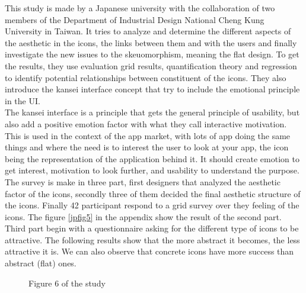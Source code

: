 \documentclass[a4paper,11pt] {article}
\theoremstyle{definition}
\begin{document}
    This study \cite{jpAnalitics} is made by a Japanese university with the collaboration of two members of the Department of Industrial Design National Cheng Kung University in Taiwan. It tries to analyze and determine the different aspects of the aesthetic in the icons, the links between them and with the users and finally investigate the new issues to the skeuomorphism, meaning the flat design. To get the results, they use evaluation grid results, quantification theory and regression to identify potential relationships between constituent of the icons. They also introduce the kansei interface concept that try to include the emotional principle in the UI.\\

    The kansei interface is a principle that gets the general principle of usability, but also add a positive emotion factor with what they call interactive motivation. This is used in the context of the app market, with lots of app doing the same things and where the need is to interest the user to look at your app, the icon being the representation of the application behind it. It should create emotion to get interest, motivation to look further, and usability to understand the purpose.\\

    The survey is make in three part, first designers that analyzed the aesthetic factor of the icons, secondly three of them decided the final aesthetic structure of the icons. Finally 42 participant respond to a grid survey over they feeling of the icons. The figure \ref{jpfig5} in the appendix show the result of the second part.\\

    Third part begin with a questionnaire asking for the different type of icons to be attractive. The following results show that the more abstract it becomes, the less attractive it is. We can also observe that concrete icons have more success than abstract (flat) ones.

    \begin{figure}[H]
      \caption{Figure 6 of the study \label{jpfig6}}
    \end{figure}
\end{document}
